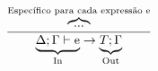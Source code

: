 \begin{figure}[h!]
  \begin{gather*}
    \frac{\overbrace{\text{...}}^{\text{Específico para cada expressão e}}}
    {\underbrace{\Delta;\Gamma \vdash \text{e}}_{\text{In}} \rightarrow
      \underbrace{T;\Gamma}_{\text{Out}}}
  \end{gather*}
  \label{fig:synthesize}
\end{figure}




